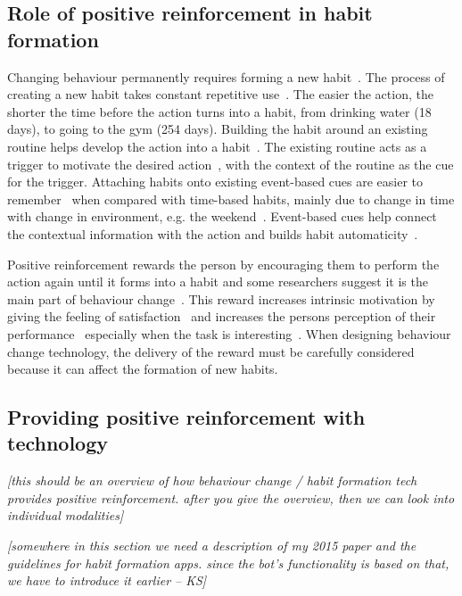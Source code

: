 \documentclass{scaffold/sigchi}
\begin{document}
\subsection{Role of positive reinforcement in habit formation}
Changing behaviour permanently requires forming a new habit~\cite{article_experiences_of_habit_formation}. The process of creating a new habit takes constant repetitive use~\cite{article_how_habits_formed_modelling_habit_formation}. The easier the action, the shorter the time before the action turns into a habit, from drinking water (18 days), to going to the gym (254 days). Building the habit around an existing routine helps develop the action into a habit~\cite{habits_event_cues_1}. The existing routine acts as a trigger to motivate the desired action~\cite{habits_event_cues_2}, with the context of the routine as the cue for the trigger. Attaching habits onto existing event-based cues are easier to remember~\cite{article_implementation_intentions_multicue} when compared with time-based habits, mainly due to change in time with change in environment, e.g. the weekend~\cite{coaching_not_that_good}. Event-based cues help connect the contextual information with the action and builds habit automaticity~\cite{article_implementation_intentions}.

Positive reinforcement rewards the person by encouraging them to perform the action again until it forms into a habit and some researchers suggest it is the main part of behaviour change~\cite{article_a_self_efficacy}. This reward increases intrinsic motivation by giving the feeling of satisfaction~\cite{article_promoting_habit_formation} and increases the persons perception of their performance~\cite{positive_reinforcement_pro} especially when the task is interesting~\cite{article_meta_analytic_review_intrinsic_motivation}. When designing behaviour change technology, the delivery of the reward must be carefully considered because it can affect the formation of new habits.

\subsection{Providing positive reinforcement with technology}
\emph{[this should be an overview of how behaviour change / habit formation tech provides positive reinforcement. after you give the overview, then we can look into individual modalities]}

\emph{[somewhere in this section we need a description of my 2015 paper and the guidelines for habit formation apps. since the bot's functionality is based on that, we have to introduce it earlier -- KS]}
\end{document}
